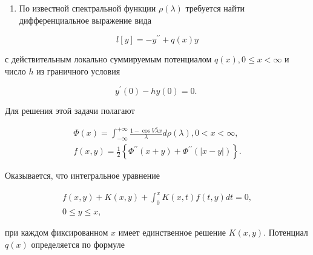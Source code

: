 \documentclass[10pt]{article}
\begin{document}
\begin{enumerate}

  \item По известной спектральной функции $\rho(\lambda)$ требуется найти дифференциальное выражение вида

\end{enumerate}



\[

l[y]=-y^{\prime \prime}+q(x) y

\]



с действительным локально суммируемым потенциалом $q(x), 0 \leqslant x<\infty$ и число $h$ из граничного условия



\[

y^{\prime}(0)-h y(0)=0 \text {. }

\]



Для решения этой задачи полагают



\[

\begin{gathered}

\Phi(x)=\int_{-\infty}^{+\infty} \frac{1-\cos V \bar{\lambda} x}{\lambda} d \rho(\lambda), 0<x<\infty, \\

f(x, y)=\frac{1}{2}\left\{\Phi^{\prime \prime}(x+y)+\Phi^{\prime \prime}(|x-y|)\right\} .

\end{gathered}

\]



Оказывается, что интегральное уравнение



\[

\begin{gathered}

f(x, y)+K(x, y)+\int_{0}^{x} K(x, t) f(t, y) d t=0, \\

0 \leqslant y \leqslant x,

\end{gathered}

\]



при каждом фиксированном $x$ имеет единственное решение $K(x, y)$. Потенциал $q(x)$ определяется по формуле
\end{document}
